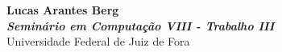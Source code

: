 \thispagestyle{empty}
\begin{center}
  \Large{\textbf{Lucas Arantes Berg}}\\
  \vspace{7.5cm}
  \huge{\textbf{\textsl{Seminário em Computação VIII - Trabalho III}}}\\
  \vspace{11.0cm}
  \Large{Universidade Federal de Juiz de Fora}\\
\end{center}
